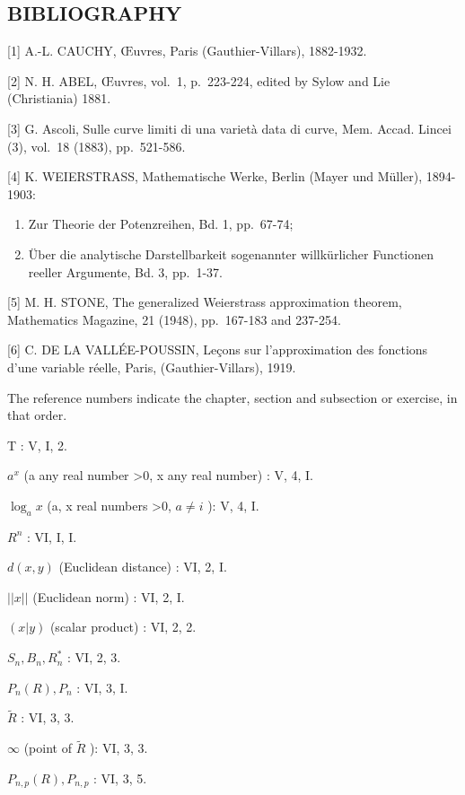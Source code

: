 \subsection*{BIBLIOGRAPHY}

{[}1{]} A.-L. CAUCHY, Œuvres, Paris (Gauthier-Villars), 1882-1932.

{[}2{]} N. H. ABEL, Œuvres, vol.~1, p.~223-224, edited by Sylow and Lie (Christiania) 1881.

{[}3{]} G. Ascoli, Sulle curve limiti di una varietà data di curve, Mem. Accad. Lincei (3), vol.~18 (1883), pp.~521-586.

{[}4{]} K. WEIERSTRASS, Mathematische Werke, Berlin (Mayer und Müller), 1894-1903:

\begin{enumerate}
\def\labelenumi{\alph{enumi})}
\item
  Zur Theorie der Potenzreihen, Bd. 1, pp.~67-74;
\item
  Über die analytische Darstellbarkeit sogenannter willkürlicher Functionen reeller Argumente, Bd. 3, pp.~1-37.
\end{enumerate}

{[}5{]} M. H. STONE, The generalized Weierstrass approximation theorem, Mathematics Magazine, 21 (1948), pp.~167-183 and 237-254.

{[}6{]} C. DE LA VALLÉE-POUSSIN, Leçons sur l'approximation des fonctions d'une variable réelle, Paris, (Gauthier-Villars), 1919.

The reference numbers indicate the chapter, section and subsection or exercise, in that order.

T : V, I, 2.

\(a^{x}\) (a any real number \textgreater0, x any real number) : V, 4, I.

\(\log_{a}x\) (a, x real numbers \textgreater0, \(a \neq i\) ): V, 4, I.

\(R^{n}\) : VI, I, I.

\(d(x, y)\) (Euclidean distance) : VI, 2, I.

\(||x||\) (Euclidean norm) : VI, 2, I.

\((x|y)\) (scalar product) : VI, 2, 2.

\(S_{n}, B_{n}, R_{n}^{*}\) : VI, 2, 3.

\(P_{n}(R), P_{n}\) : VI, 3, I.

\(\tilde{R}\) : VI, 3, 3.

\(\infty\) (point of \(\tilde{R}\) ): VI, 3, 3.

\(P_{n,p}(R), P_{n,p}\) : VI, 3, 5.

